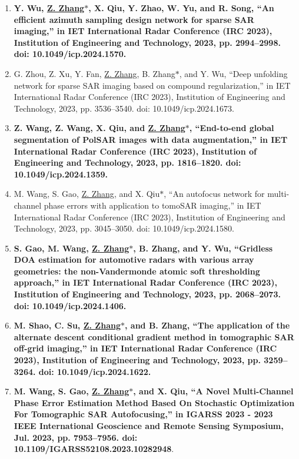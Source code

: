 \documentclass[paper=a4,fontsize=11pt]{scrartcl}
\begin{document}
\begin{enumerate}
	
	\item \textbf{Y. Wu, \underline{Z. Zhang$\ast$}, X. Qiu, Y. Zhao, W. Yu, and R. Song, ``An efficient azimuth sampling design network for sparse SAR imaging,'' in IET International Radar Conference (IRC 2023), Institution of Engineering and Technology, 2023, pp. 2994–2998. doi: 10.1049/icp.2024.1570.}
	
	\item G. Zhou, Z. Xu, Y. Fan, \underline{Z. Zhang}, B. Zhang$\ast$, and Y. Wu, ``Deep unfolding network for sparse SAR imaging based on compound regularization,'' in IET International Radar Conference (IRC 2023), Institution of Engineering and Technology, 2023, pp. 3536–3540. doi: 10.1049/icp.2024.1673.
	
	\item \textbf{Z. Wang, Z. Wang, X. Qiu, and \underline{Z. Zhang$\ast$}, ``End-to-end global segmentation of PolSAR images with data augmentation,'' in IET International Radar Conference (IRC 2023), Institution of Engineering and Technology, 2023, pp. 1816–1820. doi: 10.1049/icp.2024.1359.}
	
	\item M. Wang, S. Gao, \underline{Z. Zhang}, and X. Qiu$\ast$, ``An autofocus network for multi-channel phase errors with application to tomoSAR imaging,'' in IET International Radar Conference (IRC 2023), Institution of Engineering and Technology, 2023, pp. 3045–3050. doi: 10.1049/icp.2024.1580.
	
	\item \textbf{S. Gao, M. Wang, \underline{Z. Zhang$\ast$}, B. Zhang, and Y. Wu, ``Gridless DOA estimation for automotive radars with various array geometries: the non-Vandermonde atomic soft thresholding approach,'' in IET International Radar Conference (IRC 2023), Institution of Engineering and Technology, 2023, pp. 2068–2073. doi: 10.1049/icp.2024.1406.}
	
	\item \textbf{M. Shao, C. Su, \underline{Z. Zhang$\ast$}, and B. Zhang, ``The application of the alternate descent conditional gradient method in tomographic SAR off-grid imaging,'' in IET International Radar Conference (IRC 2023), Institution of Engineering and Technology, 2023, pp. 3259–3264. doi: 10.1049/icp.2024.1622.}
	
	\item \textbf{ M. Wang, S. Gao, \underline{Z. Zhang$\ast$}, and X. Qiu, ``A Novel Multi-Channel Phase Error Estimation Method Based On Stochastic Optimization For Tomographic SAR Autofocusing,'' in IGARSS 2023 - 2023 IEEE International Geoscience and Remote Sensing Symposium, Jul. 2023, pp. 7953–7956. doi: 10.1109/IGARSS52108.2023.10282948}.
	

\end{enumerate}
\end{document}
